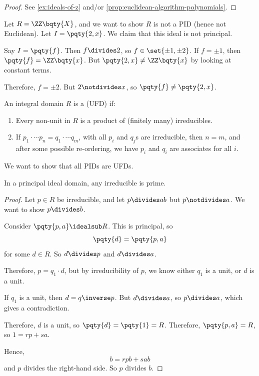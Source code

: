 \begin{proof}
    See \autoref{ex:ideals-of-z} and/or \autoref{prop:euclidean-algorithm-polynomials}.
\end{proof}

\begin{example}
    \label{ex:non-example-pid}%
    Let \(R = \ZZ\bqty{X}\), and we want to show \(R\) is not a PID (hence not Euclidean). Let \(I = \pqty{2, x}\). We claim that this ideal is not principal.

    Say \(I = \pqty{f}\). Then \(f \divides 2\), so \(f \in \set{\pm 1, \pm 2}\). If \(f = \pm 1\), then \(\pqty{f} = \ZZ\bqty{x}\). But \(\pqty{2, x} \neq \ZZ\bqty{x}\) by looking at constant terms.

    Therefore, \(f = \pm 2\). But \(2 \notdivides x\), so \(\pqty{f} \neq \pqty{2, x}\).
\end{example}

\begin{definition}
    \label{def:ufd}%
    An integral domain \(R\) is a  (UFD) if:
    \begin{enumerate}
        \item Every non-unit in \(R\) is a product of (finitely many) irreducibles.
        \item If \(p_1 \cdot \cdots p_n = q_1 \cdot \cdots q_m\), with all \(p_i\) and \(q_j\)s are irreducible, then \(n = m\), and after some possible re-ordering, we have \(p_i\) and \(q_i\) are associates for all \(i\).
    \end{enumerate}
\end{definition}

We want to show that all PIDs are UFDs.

\begin{lemma}
    \label{lem:irreducible-primes-pid}%
    In a principal ideal domain, any irreducible is prime.
\end{lemma}

\begin{proof}
    Let \(p \in R\) be irreducible, and let \(p \divides ab\) but \(p \notdivides a\). We want to show \(p \divides b\).

    Consider \(\pqty{p, a} \idealsub R\). This is principal, so
    \[
        \pqty{d} = \pqty{p, a}
    \]
    for some \(d \in R\). So \(d \divides p\) and \(d \divides a\).

    Therefore, \(p = q_1 \cdot d\), but by irreducibility of \(p\), we know either \(q_1\) is a unit, or \(d\) is a unit.

    If \(q_1\) is a unit, then \(d = q\inverse p\). But \(d \divides a\), so \(p \divides a\), which gives a contradiction.

    Therefore, \(d\) is a unit, so \(\pqty{d} = \pqty{1} = R\). Therefore, \(\pqty{p, a} = R\), so \(1 = rp + sa\).

    Hence,
    \[
        b = r p b + s a b
    \]
    and \(p\) divides the right-hand side. So \(p\) divides \(b\).
\end{proof}

